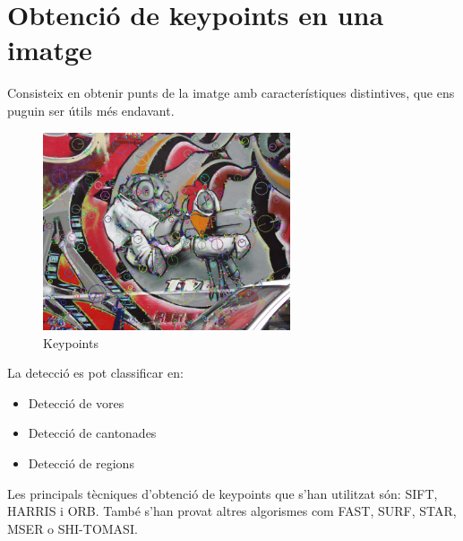 \section{Obtenció de keypoints en una imatge}
	Consisteix en obtenir punts de la imatge amb característiques distintives, que ens puguin ser útils més endavant.\\
	\begin{figure}[H]
		\centering
		\includegraphics[width=0.65\textwidth]{images/RobotKp}
		\caption{Keypoints}
	\end{figure}
	\noindent
	La detecció es pot classificar en:\\
	\begin{itemize}
		\item{Detecció de vores}
		\item{Detecció de cantonades}
		\item{Detecció de regions\\}
	\end{itemize}
	Les principals tècniques d'obtenció de keypoints que s'han utilitzat són: SIFT, HARRIS i ORB.
	També s'han provat altres algorismes com FAST, SURF, STAR, MSER o SHI-TOMASI.

